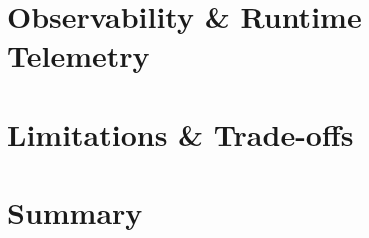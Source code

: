\section{Observability \& Runtime Telemetry}

\section{Limitations \& Trade-offs}

\section{Summary}
